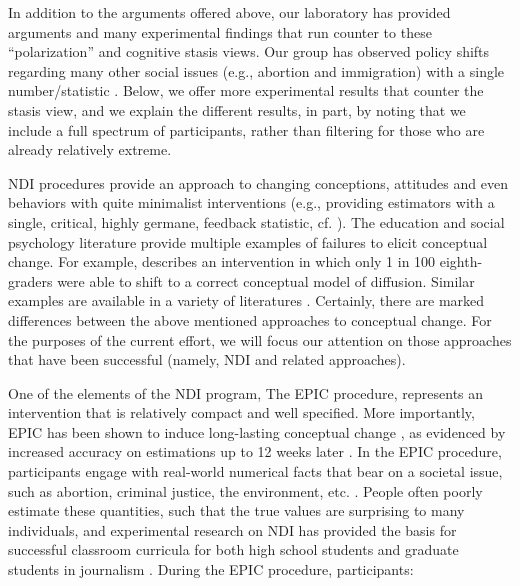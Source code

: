In addition to the arguments offered above, our laboratory has provided
arguments and many experimental findings that run counter to these
``polarization'' and cognitive stasis views.  Our group has observed
policy shifts regarding many other social issues (e.g., abortion and
immigration) with a single number/statistic
\parencite{garcia_de_osuna_qualitative_2004,munnich_policy_2003,ranney_designing_2008}.
Below, we offer more experimental results that counter the stasis view, and we
explain the different results, in part, by noting that we include a full
spectrum of participants, rather than filtering for those who are already
relatively extreme.


NDI procedures \cite[introduced by][]{ranney_numerically_2001_fixed} provide an
approach to changing conceptions, attitudes and even behaviors with quite
minimalist interventions (e.g., providing estimators with a single, critical,
highly germane, feedback statistic, cf. ).  The
education and social psychology literature provide multiple examples of failures
to elicit conceptual change. For example, \citeauthor{chi_commonsense_2005} describes
an intervention in which only 1 in 100 eighth-graders were able to shift to a
correct conceptual model of diffusion. Similar examples are available in a
variety of literatures \cite[cf.][]{disessa_what_1998, lord_biased_1979}.
Certainly, there are marked differences between the above mentioned approaches to
conceptual change. For the purposes of the current effort, we will focus our
attention on those approaches that have been successful (namely, NDI and related
approaches).

One of the elements of the NDI program, The EPIC procedure, represents an
intervention that is relatively compact and well specified. More importantly,
EPIC has been shown to induce long-lasting conceptual change
\cite[e.g.,][]{ranney_designing_2008}, as evidenced by increased accuracy on estimations
up to 12 weeks later \cite{munnich_longevities_2005}.  In the EPIC procedure,
participants engage with real-world numerical facts that bear on a societal
issue, such as abortion, criminal justice, the environment, etc.
\cite[e.g.,][]{garcia_de_osuna_qualitative_2004,munnich_policy_2003}.  
People often poorly
estimate these quantities, such that the true values are surprising to many
individuals, and experimental research on NDI has provided the basis for
successful classroom curricula for both high school students and graduate
students in journalism
\cite{munnich_numerically-driven_2004,ranney_designing_2008}.  During the EPIC
procedure, participants:

